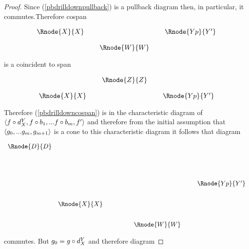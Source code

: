 \documentclass[10pt,a4paper]{scrartcl}
\begin{document}
\begin{proof}
\noindent Since (\ref{pbdrilldownpullback})
is a pullback diagram then, in particular, it commutes.Therefore cospan 


\begin{center}
\begin{equation}
\label{pbdrilldowncospan}
\begin{array}{cp{0.1cm}cp{0.1cm} c}
\Rnode{X}{X}& &                & & \Rnode{Yp}{Y'} \\ [0.4cm]
            & &\Rnode{W}{W}
\end{array}
\end{equation}
\end{center}
is a coincident  to span 
\begin{center}
\begin{equation}
\begin{array}{cp{0.1cm}cp{0.1cm} c}
            & &\Rnode{Z}{Z}                  \\ [0.4cm]
\Rnode{X}{X}& &                & & \Rnode{Yp}{Y'} 
\end{array}
\end{equation}
\end{center}

Therefore (\ref{pbdrilldowncospan}) is in the characteristic diagram of
$\langle f \circ d^{Y}_{X}, f \circ b_1, ... f \circ b_m,f'\rangle$ and therefore from the initial assumption that $\langle g_0,...g_m, g_{m+1}\rangle$ is a cone to this characteristic diagram it follows that diagram 
\begin{center}
\begin{displaymath}
\begin{array}{c c p{1.0cm} c p{0.2cm}c}
  \Rnode{D}{D} & &                       & &  &                  \\ [1.6cm]
               & &                       & &  & \Rnode{Yp}{Y'}   \\ [0.7cm]
	             &  \Rnode{X}{X} & &  &                  \\ [0.7cm]
	             & &                       & \Rnode{W}{W} & & 
\end{array} 
\end{displaymath}
\end{center}
commutes. But $g_0 = g \circ d^{Y}_{X}$ and therefore diagram


\end{proof}
\end{document}
